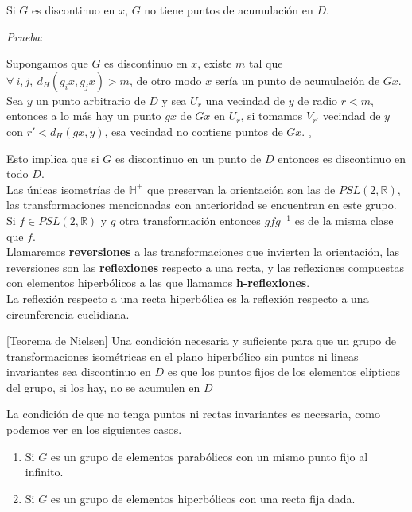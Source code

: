 \begin{prop}
Si $G$ es discontinuo en $x$, $G$ no tiene puntos de acumulaci\'on en $D$.
\end{prop}

\textit{Prueba}:

Supongamos que $G$ es discontinuo en $x$, existe $m$ tal que $\forall \ i,j, \  d_{H}(g_{i}x,g_{j}x) > m$, de otro modo $x$ ser\'ia un punto de acumulaci\'on de $Gx$. Sea $y$ un punto arbitrario de $D$ y sea $U_{r}$ una vecindad de $y$ de radio $r < m$, entonces a lo m\'as hay un punto $gx$ de $Gx$ en $U_{r}$, si tomamos $V_{r'}$ vecindad de $y$ con $r' < d_{H}(gx,y)$, esa vecindad no contiene puntos de $Gx$. $_{\square}$

Esto implica que si $G$  es discontinuo en un punto de  $D$ entonces es discontinuo en todo
$D$.\\

Las \'unicas isometr\'ias de $\mathbb{H}^{+} $ que preservan la orientaci\'on
son las de $PSL(2,\mathbb{R})$, las transformaciones mencionadas con
anterioridad se encuentran en este grupo. Si $f \in PSL(2,\mathbb{R})$ y $g$  otra transformaci\'on  entonces $gfg^{-1}$ es de la misma clase que $f$.\\

Llamaremos \textbf{reversiones} a las transformaciones que invierten
la orientaci\'on, las reversiones son las \textbf{reflexiones}
respecto a una recta, y las reflexiones compuestas con elementos
hiperb\'olicos a las que llamamos \textbf{h-reflexiones}. \\


La reflexi\'on respecto a una recta hiperb\'olica es la reflexi\'on
respecto a una circunferencia euclidiana. \\


\begin{thm} \label{Teorema-nielsen} [Teorema de Nielsen]
Una condici\'on necesaria y suficiente para que un grupo de
transformaciones isom\'etricas en el plano hiperb\'olico sin puntos
ni lineas invariantes sea discontinuo en $D $ es que los puntos
fijos de los elementos el\'ipticos del grupo, si los hay, no se
acumulen en $D$

\end{thm}

La condici\'on de que no tenga puntos ni rectas invariantes es
necesaria, como podemos ver en los siguientes casos.

\begin{enumerate}
\item Si $G$ es un grupo de elementos parab\'olicos con un mismo punto
fijo al infinito.
\item Si $G$ es un grupo de elementos hiperb\'olicos con una recta fija
dada.
\end{enumerate}

